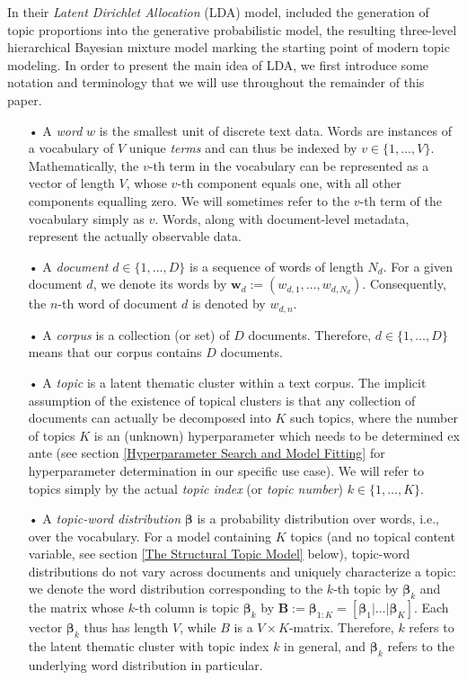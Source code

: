 In their \textit{Latent Dirichlet Allocation} (LDA) model, \cite{blei2003latent} included the generation of topic proportions into the generative probabilistic model, the resulting three-level hierarchical Bayesian mixture model marking the starting point of modern topic modeling. In order to present the main idea of LDA, we first introduce some notation and terminology that we will use throughout the remainder of this paper.

\begin{itemize}
\vspace{-0.25cm}
\item[•] A \textit{word} $w$ is the smallest unit of discrete text data. Words are instances of a vocabulary of $V$ unique \textit{terms} and can thus be indexed by $v \in \{1,\dots,V\}$. Mathematically, the $v$-th term in the vocabulary can be represented as a vector of length $V$, whose $v$-th component equals one, with all other components equalling zero. We will sometimes refer to the $v$-th term of the vocabulary simply as $v$. Words, along with document-level metadata, represent the actually observable data.
\vspace{-0.25cm}
\item[•] A \textit{document} $d \in \{1,\dots,D\}$ is a sequence of words of length $N_{d}$. For a given document $d$, we denote its words by $\boldsymbol{w}_d:=(w_{d,1},\dots,w_{d,N_{d}})$. Consequently, the $n$-th word of document $d$ is denoted by $w_{d,n}$.
\vspace{-0.25cm}
\item[•] A \textit{corpus} is a collection (or set) of $D$ documents. Therefore, $d \in \{1,\dots,D\}$ means that our corpus contains $D$ documents.
\vspace{-0.25cm}
\item[•] A \textit{topic} is a latent thematic cluster within a text corpus. The implicit assumption of the existence of topical clusters is that any collection of documents can actually be decomposed into $K$ such topics, where the number of topics $K$ is an (unknown) hyperparameter which needs to be determined ex ante (see section \ref{Hyperparameter Search and Model Fitting} for hyperparameter determination in our specific use case). We will refer to topics simply by the actual \textit{topic index} (or \textit{topic number}) $k \in \{1,\dots,K\}$.
\vspace{-0.25cm}
\item[•] A \textit{topic-word distribution} $\boldsymbol{\beta}$ is a probability distribution over words, i.e., over the vocabulary. For a model containing $K$ topics (and no topical content variable, see section \ref{The Structural Topic Model} below), topic-word distributions do not vary across documents and uniquely characterize a topic: we denote the word distribution corresponding to the $k$-th topic by $\boldsymbol{\beta}_k$ and the matrix whose $k$-th column is topic $\boldsymbol{\beta}_k$ by $\boldsymbol{B}:=\boldsymbol{\beta}_{1:K}=[\boldsymbol{\beta}_1|\dots|\boldsymbol{\beta}_K]$. Each vector $\boldsymbol{\beta}_k$ thus has length $V$, while $B$ is a $V \times K$-matrix. Therefore, $k$ refers to the latent thematic cluster with topic index $k$ in general, and $\boldsymbol{\beta}_k$ refers to the underlying word distribution in particular.

\end{itemize}
